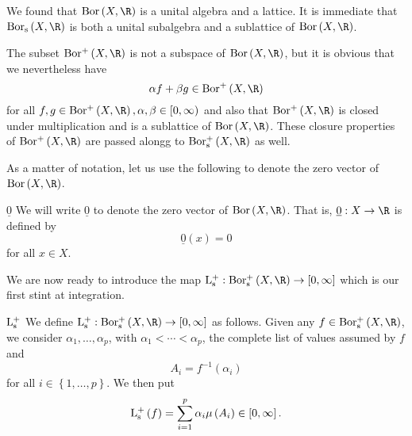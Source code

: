 \documentclass[pmath450]{subfiles}
\begin{document}
    \np We found that $\bor\left( X,\R \right)$ is a unital algebra and a lattice. It is immediate that $\bors\left( X,\R \right)$ is both a unital subalgebra and a sublattice of $\bor\left( X,\R \right)$. 

    The subset $\borplus\left( X,\R \right)$ is not a subspace of $\bor\left( X,\R \right)$, but it is obvious that we nevertheless have
    \begin{equation*}
        \alpha f+\beta g \in \borplus\left( X,\R \right)
    \end{equation*}
    for all $f,g\in\borplus\left( X,\R \right), \alpha,\beta\in\left[ 0,\infty \right)$ and also that $\borplus\left( X,\R \right)$ is closed under multiplication and is a sublattice of $\bor\left( X,\R \right)$. These closure properties of $\borplus\left( X,\R \right)$ are passed alongg to $\borpluss\left( X,\R \right)$ as well.

    As a matter of notation, let us use the following to denote the zero vector of $\bor\left( X,\R \right)$.

    \begin{notation}{$\underline{0}$}
        We will write $\underline{0}$ to denote the zero vector of $\bor\left( X,\R \right)$. That is, $\underline{0}:X\to\R$ is defined by
        \begin{equation*}
            \underline{0}\left( x \right) = 0
        \end{equation*}
        for all $x\in X$.
    \end{notation}

    \np We are now ready to introduce the map $\lpluss:\borpluss\left( X,\R \right)\to\left[ 0,\infty \right]$ which is our first stint at integration.

    \begin{notation}{$\operatorname{L^+_s}$}
        We define $\lpluss:\borpluss\left( X,\R \right)\to\left[ 0,\infty \right]$ as follows. Given any $f\in\borpluss\left( X,\R \right)$, we consider $\alpha_1,\ldots,\alpha_p$, with $\alpha_1<\cdots<\alpha_p$, the complete list of values assumed by $f$ and
        \begin{equation*}
            A_i = f^{-1}\left( \alpha_i \right)
        \end{equation*}
        for all $i\in\left\lbrace 1,\ldots,p \right\rbrace$. We then put
        \begin{equation}
            \operatorname{L^+_s}\left( f \right) = \sum^{p}_{i=1}\alpha_i\mu\left( A_i \right)\in\left[ 0,\infty \right].
        \end{equation}
    \end{notation}
\end{document}
